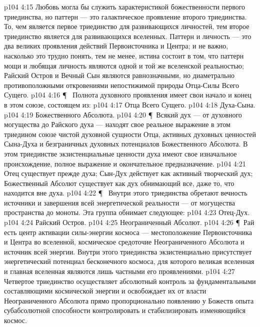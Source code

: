 \vs p104 4:15 Любовь могла бы служить характеристикой божественности первого триединства, но паттерн --- это галактическое проявление второго триединства. То, чем является первое триединство для развивающихся личностей, тем второе триединство является для развивающихся вселенных. Паттерн и личность --- это два великих проявления действий Первоисточника и Центра; и не важно, насколько это трудно понять, тем не менее, истина состоит в том, что паттерн мощи и любящая личность являются одной и той же вселенской реальностью; Райский Остров и Вечный Сын являются равнозначными, но диаметрально противоположными откровениями непостижимой природы Отца\hyp{}Силы Всего Сущего.
\vs p104 4:16 \P\  Полнота духовного проявления имеет свои начало и конец в этом союзе, состоящем из:
\vs p104 4:17 \bibnobreakspace Отца Всего Сущего.
\vs p104 4:18 \bibnobreakspace Духа\hyp{}Сына.
\vs p104 4:19 \bibnobreakspace Божественного Абсолюта.
\vs p104 4:20 \P\ Всякий дух --- от духовного могущества до Райского духа --- находят свое реальное выражение в этом триедином союзе чистой духовной сущности Отца, активных духовных ценностей Сына\hyp{}Духа и безграничных духовных потенциалов Божественного Абсолюта. В этом триединстве экзистенциальные ценности духа имеют свое изначальное происхождение, полное выражение и окончательное предназначение.
\vs p104 4:21 Отец существует прежде духа; Сын\hyp{}Дух действует как активный творческий дух; Божественный Абсолют существует как дух обнимающий все, даже то, что находится вне духа.
\vs p104 4:22 \P\  Внутри этого триединства обретают вечность источники и завершения всей энергетической реальности --- от могущества пространства до моноты. Эта группа обнимает следующее:
\vs p104 4:23 \bibnobreakspace Отец\hyp{}Дух.
\vs p104 4:24 \bibnobreakspace Райский Остров.
\vs p104 4:25 \bibnobreakspace Неограниченный Абсолют.
\vs p104 4:26 \P\ Рай есть центр активации силы\hyp{}энергии космоса --- местоположение Первоисточника и Центра во вселенной, космическое средоточие Неограниченного Абсолюта и источник всей энергии. Внутри этого триединства экзистенциально присутствует энергетический потенциал бесконечного космоса, для которого великая вселенная и главная вселенная являются лишь частными его проявлениями.
\vs p104 4:27 Четвертое триединство осуществляет абсолютный контроль за фундаментальными составляющими космической энергии и освобождает их от власти Неограниченного Абсолюта прямо пропорционально появлению у Божеств опыта субабсолютной способности контролировать и стабилизировать изменяющийся космос.
